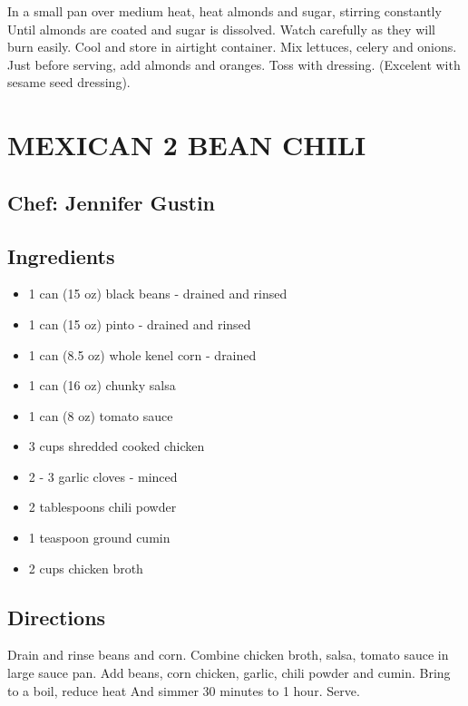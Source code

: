 \documentclass[
]{book}
\providecommand{\tightlist}{%
  \setlength{\itemsep}{0pt}\setlength{\parskip}{0pt}}
\begin{document}
In a small pan over medium heat, heat almonds and sugar, stirring constantly
Until almonds are coated and sugar is dissolved. Watch carefully as they will burn easily.
Cool and store in airtight container. Mix lettuces, celery and onions. Just before
serving, add almonds and oranges. Toss with dressing. (Excelent with sesame seed dressing).

\hypertarget{mexican-2-bean-chili}{%
\section*{MEXICAN 2 BEAN CHILI}\label{mexican-2-bean-chili}}


\hypertarget{chef-jennifer-gustin-5}{%
\subsection*{Chef: Jennifer Gustin}\label{chef-jennifer-gustin-5}}


\hypertarget{ingredients-21}{%
\subsection*{Ingredients}\label{ingredients-21}}


\begin{itemize}
\tightlist
\item
  1 can (15 oz) black beans - drained and rinsed
\item
  1 can (15 oz) pinto - drained and rinsed
\item
  1 can (8.5 oz) whole kenel corn - drained
\item
  1 can (16 oz) chunky salsa
\item
  1 can (8 oz) tomato sauce
\item
  3 cups shredded cooked chicken
\item
  2 - 3 garlic cloves - minced
\item
  2 tablespoons chili powder
\item
  1 teaspoon ground cumin
\item
  2 cups chicken broth
\end{itemize}

\hypertarget{directions-21}{%
\subsection*{Directions}\label{directions-21}}


Drain and rinse beans and corn. Combine chicken broth, salsa, tomato sauce in large sauce pan.
Add beans, corn chicken, garlic, chili powder and cumin. Bring to a boil, reduce heat
And simmer 30 minutes to 1 hour. Serve.
\end{document}
